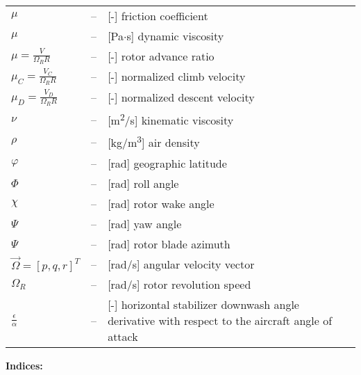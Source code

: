 \begin{longtable}[l]{ l l p{} }
  $\mu$                                                  & -- & [-] friction coefficient \\
  $\mu$                                                  & -- & [Pa$\cdot$s] dynamic viscosity \\
  $\mu=\frac{V}{\Omega_R R}$                             & -- & [-] rotor advance ratio \\
  $\mu_C=\frac{V_C}{\Omega_R R}$                         & -- & [-] normalized climb velocity \\
  $\mu_D=\frac{V_D}{\Omega_R R}$                         & -- & [-] normalized descent velocity \\
  $\nu$                                                  & -- & [m\textsuperscript{2}/s] kinematic viscosity \\
  $\rho$                                                 & -- & [kg/m\textsuperscript{3}] air density \\
  $\varphi$                                              & -- & [rad] geographic latitude \\
  $\Phi$                                                 & -- & [rad] roll angle \\
  $\chi$                                                 & -- & [rad] rotor wake angle \\
  $\Psi$                                                 & -- & [rad] yaw angle \\
  $\Psi$                                                 & -- & [rad] rotor blade azimuth \\
  $\vec \Omega=\left[ p, q, r \right]^T$                 & -- & [rad/s] angular velocity vector \\
  $\Omega_R$                                             & -- & [rad/s] rotor revolution speed \\
  $\frac{\epsilon}{\alpha}$                              & -- & [-] horizontal stabilizer downwash angle derivative with respect to the aircraft angle of attack \\
\end{longtable}

\noindent \textbf{Indices:}

